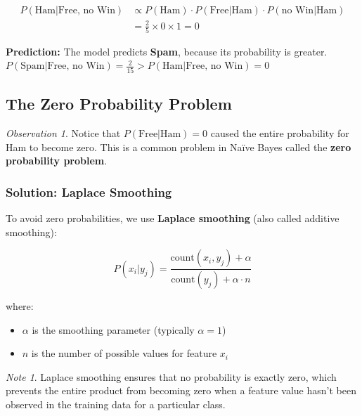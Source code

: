 \documentclass[11pt,a4paper]{article}
\theoremstyle{definition}
\theoremstyle{plain}
\theoremstyle{remark}
\newtheorem*{remark}{Note}
\newtheorem*{observation}{Observation}
\begin{document}
\begin{align}
P(\text{Ham} | \text{Free, no Win}) &\propto P(\text{Ham}) \cdot P(\text{Free}|\text{Ham}) \cdot P(\text{no Win}|\text{Ham}) \\
&= \frac{2}{5} \times 0 \times 1 = 0
\end{align}

\begin{center}
\colorbox{red!15}{\parbox{0.9\textwidth}{
\centering
\textbf{Prediction:} The model predicts \textbf{Spam}, because its probability is greater.\\[0.2cm]
$P(\text{Spam} | \text{Free, no Win}) = \frac{2}{15} > P(\text{Ham} | \text{Free, no Win}) = 0$
}}
\end{center}

\subsection{The Zero Probability Problem}

\begin{observation}
Notice that $P(\text{Free}|\text{Ham}) = 0$ caused the entire probability for Ham to become zero. This is a common problem in Naïve Bayes called the \textbf{zero probability problem}.
\end{observation}

\subsubsection{Solution: Laplace Smoothing}

To avoid zero probabilities, we use \textbf{Laplace smoothing} (also called additive smoothing):

\begin{equation}
P(x_i | y_j) = \frac{\text{count}(x_i, y_j) + \alpha}{\text{count}(y_j) + \alpha \cdot n}
\end{equation}

where:
\begin{itemize}
    \item $\alpha$ is the smoothing parameter (typically $\alpha = 1$)
    \item $n$ is the number of possible values for feature $x_i$
\end{itemize}

\begin{remark}
Laplace smoothing ensures that no probability is exactly zero, which prevents the entire product from becoming zero when a feature value hasn't been observed in the training data for a particular class.
\end{remark}
\end{document}
